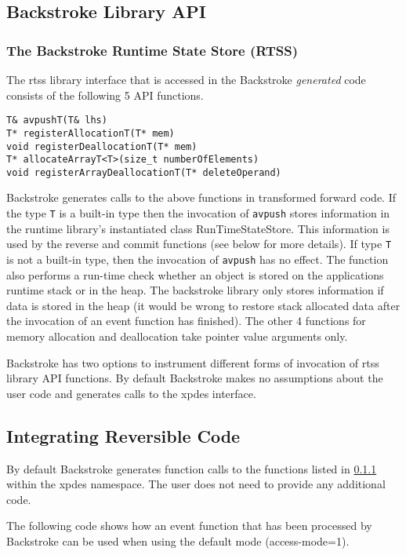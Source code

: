 \documentclass[english,12pt, titlepage]{article}      %
\begin{document}
\subsection{Backstroke Library API}

\subsubsection{The Backstroke Runtime State Store (RTSS)}
\label{rtssapi}
The rtss library interface that is accessed in the
Backstroke {\em generated} code consists of the following 5 API functions.

\begin{verbatim}
T& avpushT(T& lhs)
T* registerAllocationT(T* mem)
void registerDeallocationT(T* mem)
T* allocateArrayT<T>(size_t numberOfElements)
void registerArrayDeallocationT(T* deleteOperand)
\end{verbatim}

Backstroke generates calls to the above functions in transformed
forward code.  If the type \verb+T+ is a built-in type then the
invocation of \verb+avpush+ stores information in the runtime
library's instantiated class RunTimeStateStore. This information is
used by the reverse and commit functions (see below for more
details). If type \verb+T+ is not a built-in type, then the invocation
of \verb+avpush+ has no effect. The function also performs a run-time
check whether an object is stored on the applications runtime stack
or in the heap. The backstroke library only stores information if data
is stored in the heap (it would be wrong to restore stack allocated
data after the invocation of an event function has finished). The
other 4 functions for memory allocation and deallocation take pointer
value arguments only.

Backstroke has two options to instrument different forms of invocation of
rtss library API functions. By default Backstroke makes no
assumptions about the user code and generates calls to the xpdes interface.

\subsection{Integrating Reversible Code}
\label{sec:recordingmode}

By default Backstroke generates function calls to the functions listed
in \ref{rtssapi} within the xpdes namespace. The user does not need to
provide any additional code.

The following code shows how an event function that has been processed
by Backstroke can be used when using the default mode (access-mode=1).
\end{document}
